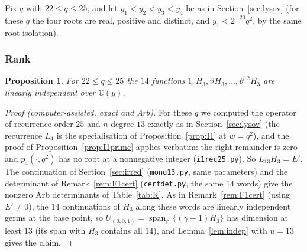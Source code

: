 \documentclass[11pt]{amsart}
\newtheorem{proposition}{Proposition}[section]
\theoremstyle{definition}
\theoremstyle{remark}
\numberwithin{equation}{section}
\newcommand{\CC}{\mathbb{C}}
\newcommand{\file}[1]{{\def\_{\textunderscore\allowbreak}\texttt{#1}}}
\begin{document}
Fix $q$ with $22\le q\le25$, and let $y_1<y_2<y_3<y_4$ be as in Section~\ref{sec:lysov} (for these $q$ the four roots are
real, positive and distinct, and $y_1<2^{-20}q^2$, by the same root isolation).

\subsubsection*{Rank}
\begin{proposition}\label{prop:rankK}
For $22\le q\le25$ the $14$ functions $1,H_3,\vartheta H_3,\dots,\vartheta^{12}H_3$ are linearly independent over $\CC(y)$.
\end{proposition}

\begin{proof}[Proof (computer-assisted, exact and Arb)]
For these $q$ we computed the operator of recurrence order $25$ and $n$-degree $13$ exactly as in Section~\ref{sec:lysov}
(the recurrence $L_4$ is the specialisation of Proposition~\ref{prop:I1} at $w=q^2$), and the proof of
Proposition~\ref{prop:I1prime} applies verbatim: the right remainder is zero and $p_4(\cdot,q^2)$ has no root at a
nonnegative integer (\file{i1\_rec25.py}). So $L_{13}H_3=E'$. The continuation of Section~\ref{sec:irred}
(\file{mono13.py}, same parameters) and the determinant of Remark~\ref{rem:F1cert} (\file{cert\_det.py}, the same $14$ words)
give the nonzero Arb determinants of Table~\ref{tab:K}. As in Remark~\ref{rem:F1cert} (using $E'\ne0$), the $14$
continuations of $H_3$ along these words are linearly independent germs at the base point, so
$U_{(0,0,1)}=\operatorname{span}_\CC\{(\gamma-1)H_3\}$ has dimension at least $13$ (its span with $H_3$ contains all
$14$), and Lemma~\ref{lem:indep} with $u=13$ gives the claim.
\end{proof}
\end{document}
